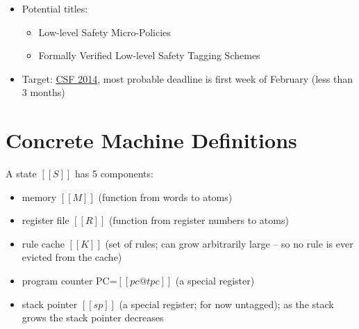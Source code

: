 \documentclass{article}
\newcommand{\bcp}[1]{{\color{blue}\em (BCP: #1)}}
\newcommand{\ch}[1]{{\color{dkblue}\em (CH: #1)}}
\begin{document}
\begin{itemize}
{{    set of registers to pass information into the fault handler?
    \ch{The problem with that is that we would need to save all these
      registers first, so that when we return to user code it can
      resume in exactly the same state. And I don't know of a way
      to do that. Maybe we just need TMURead instruction for
      reading these things out little by little (in a similar
      way to TMUL mentioned below)}
    So like the POPL-pico-machine scheme, except using registers rather
    than kernel memory? Seems good. But of course, $[[AddRule]]$ is already
    a very unrealistic instruction anyway, since it assumes that the 
    cache is infinite.}}
  \ch{Something more RISCy would be the TMUL instruction in SAFE that
    loads only one of the fields of the rule at a time, as specified
    by a register (0-8 for M vector fields, 9-17 for R vector fields,
    18 to install the rule); see section 17.2.1 in isaSpec3.pdf}
  \ch{Anyway, this seems easy to fix if we ever get there.}

\bcp{Besides MIPS, we should consider the new RISC-V instruction set from
  Berkeley.}
\item Potential titles:
  \begin{itemize}
  \item Low-level Safety Micro-Policies
  \item Formally Verified Low-level Safety Tagging Schemes
  \end{itemize}
\item Target: \href{http://csf2014.di.univr.it/}{CSF 2014}, most
  probable deadline is first week of February (less than 3 months)
\end{itemize}

\section{Concrete Machine Definitions}

A state $[[S]]$ has 5 components:
\begin{itemize}
\item memory $[[M]]$ (function from words to atoms)
\item register file $[[R]]$  (function from register numbers to atoms)
\item rule cache $[[K]]$ (set of rules; can grow arbitrarily large --
  so no rule is ever evicted from the cache)
\item program counter PC=$[[pc@tpc]]$ (a special register)
\item stack pointer $[[sp]]$ (a special register; for now untagged);
  as the stack grows the stack pointer decreases
\end{itemize}
\end{document}
